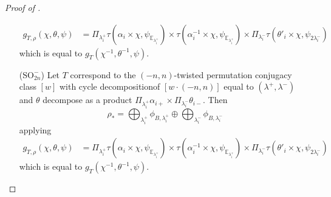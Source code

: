 \documentclass[12pt, reqno]{amsart}
\theoremstyle{definition}
\theoremstyle{definition}
\theoremstyle{definition}
\newcommand{\fieldCharacter}{\psi}
\newcommand{\quadraticExtension}{\mathbb{E}}
\newcommand{\quadraticFieldExtension}[1]{\quadraticExtension_{#1}}
\newcommand{\GaussSumCharacter}[3]{\tau\left(#1 \times #2, #3\right)}
\newcommand{\algebraicGroup}[1]{\boldsymbol{\mathrm{#1}}}
\begin{document}
\begin{proof}[Proof of ]
\begin{enumerate}
\begin{align*}
		g_{T,\rho}(\chi,\theta,\psi) &= \Pi_{\lambda_i^+} \GaussSumCharacter{\alpha_i}{\chi}{\fieldCharacter_{\quadraticFieldExtension{\lambda_i^+}}} \times \GaussSumCharacter{\alpha_i^{-1}}{\chi}{\fieldCharacter_{\quadraticFieldExtension{\lambda_i^+}}} \times \Pi_{\lambda_i^-} \GaussSumCharacter{\theta'_i}{\chi}{\fieldCharacter_{2\lambda_i^-}} 
	\end{align*}
	which is equal to $g_{T}(\chi^{-1},\theta^{-1},\psi)$.
	\item[($\algebraicGroup{SO}_{2n}^-$)] Let $T$ correspond to the $(-n,n)$-twisted permutation conjugacy class $[w]$ with cycle decompositionof $[w \cdot (-n,n)]$ equal to $(\lambda^+,\lambda^-)$ 
	and $\theta$ decompose as a product $\Pi_{\lambda_i^+ }\alpha_{i+} \times \Pi_{\lambda_i^-}\theta_{i-}$. Then
	$$\rho_* = \bigoplus_{\lambda_i^+} \phi_{B,\lambda_i^+} \oplus \bigoplus_{\lambda_i^-} \phi_{B,\lambda_i^-}$$
	applying 
	\begin{align*}
		g_{T,\rho}(\chi,\theta,\psi) &= \Pi_{\lambda_i^+} \GaussSumCharacter{\alpha_i}{\chi}{\fieldCharacter_{\quadraticFieldExtension{\lambda_i^+}}} \times \GaussSumCharacter{\alpha_i^{-1}}{\chi}{\fieldCharacter_{\quadraticFieldExtension{\lambda_i^+}}} \times \Pi_{\lambda_i^-} \GaussSumCharacter{\theta'_i}{\chi}{\fieldCharacter_{2\lambda_i^-}} 
	\end{align*}
	which is equal to $g_{T}(\chi^{-1},\theta^{-1},\psi)$.
\end{enumerate}
   
\begin{comment}
We will have to treat the unitary group case seperatedly. First for the non-unitary group case:\\




\end{comment}
\end{proof}
\end{document}
